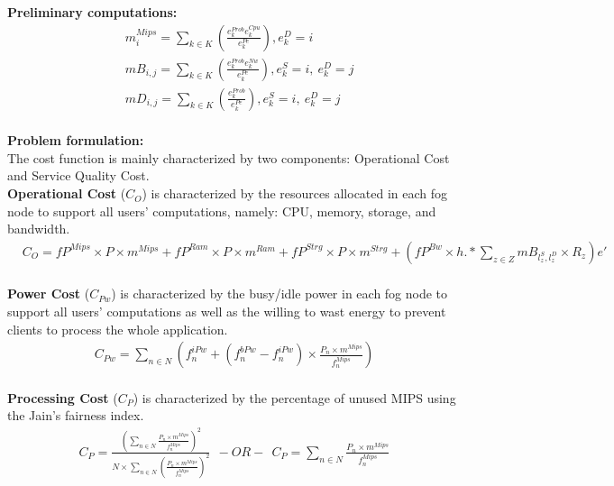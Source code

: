 \documentclass{article}
\begin{document}
\noindent\textbf{Preliminary computations:}\\[6pt]
\begin{equation*}
\begin{split}
& m^{Mips}_{i} = \sum_{k\in K} \left(\frac{e^{Prob}_k e^{Cpu}_k}{e^{Pe}_k}\right), e_k^{D} = i\\[6pt]
& mB_{i,j}= \sum_{k\in K} \left(\frac{e^{Prob}_k e^{Nw}_k}{e^{Pe}_k}\right), e^{S}_k = i,~e^{D}_k = j\\[6pt]
& mD_{i,j}= \sum_{k\in K} \left(\frac{e^{Prob}_k}{e^{Pe}_k}\right), e^{S}_k = i,~e^{D}_k = j
\end{split}
\end{equation*}\\[6pt]

\noindent\textbf{Problem formulation:}\\[6pt]
The cost function is mainly characterized by two components: Operational Cost and Service Quality Cost.\\[6pt]

\noindent\textbf{Operational Cost} ($C_O$) is characterized by the resources allocated in each fog node to support all users' computations, namely: CPU, memory, storage, and bandwidth.\\[6pt]

\begin{equation*}
\begin{split}
	& C_O = fP^{Mips} \times P \times m^{Mips} + fP^{Ram} \times P \times m^{Ram} + fP^{Strg}\times P\times m^{Strg} + \left(fP^{Bw} \times h .* \sum_{z\in Z} mB_{l^S_z,l^D_z} \times R_z\right)e'
\end{split}
\end{equation*}\\[6pt]

\noindent\textbf{Power Cost} ($C_{Pw}$) is characterized by the busy/idle power in each fog node to support all users' computations as well as the willing to wast energy to prevent clients to process the whole application.\\[6pt]
\begin{equation*}
\begin{aligned}
C_{Pw} = \sum_{n\in N}\left(f_n^{iPw} + (f_n^{bPw} - f_n^{iPw}) \times\frac{P_n \times m^{Mips}}{f_n^{Mips}}\right)
\end{aligned}
\end{equation*}\\[6pt]

\noindent\textbf{Processing Cost} ($C_P$) is characterized by the percentage of unused MIPS using the Jain's fairness index.\\[6pt]
\begin{equation*}
\begin{aligned}
C_P = \frac{\left(\sum_{n\in N} \frac{P_n \times m^{Mips}}{f_n^{Mips}}\right)^2}{N\times \sum_{n\in N} \left(\frac{P_n \times m^{Mips}}{f_n^{Mips}}\right)^2}~~ -OR- ~~ C_P = \sum_{n\in N} \frac{P_n \times m^{Mips}}{f_n^{Mips}}
\end{aligned}
\end{equation*}\\[6pt]
\end{document}
